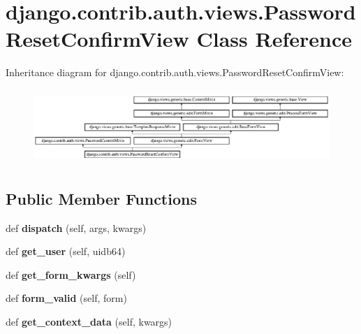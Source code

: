 \hypertarget{classdjango_1_1contrib_1_1auth_1_1views_1_1_password_reset_confirm_view}{}\section{django.\+contrib.\+auth.\+views.\+Password\+Reset\+Confirm\+View Class Reference}
\label{classdjango_1_1contrib_1_1auth_1_1views_1_1_password_reset_confirm_view}
Inheritance diagram for django.\+contrib.\+auth.\+views.\+Password\+Reset\+Confirm\+View\+:\begin{figure}[H]
\begin{center}
\leavevmode
\includegraphics[height=2.854230cm]{classdjango_1_1contrib_1_1auth_1_1views_1_1_password_reset_confirm_view}
\end{center}
\end{figure}
\subsection*{Public Member Functions}
\begin{DoxyCompactItemize}
\item 
\mbox{\label{classdjango_1_1contrib_1_1auth_1_1views_1_1_password_reset_confirm_view_a5b547ab9755b7d4ef79f688ece3e1d69}} 
def {\bfseries dispatch} (self, args, kwargs)
\item 
\mbox{\label{classdjango_1_1contrib_1_1auth_1_1views_1_1_password_reset_confirm_view_a6ed334a62932c696b4cb526a434778a7}} 
def {\bfseries get\+\_\+user} (self, uidb64)
\item 
\mbox{\label{classdjango_1_1contrib_1_1auth_1_1views_1_1_password_reset_confirm_view_a98c2c808d29b0e81720825d01c0d0de3}} 
def {\bfseries get\+\_\+form\+\_\+kwargs} (self)
\item 
\mbox{\label{classdjango_1_1contrib_1_1auth_1_1views_1_1_password_reset_confirm_view_a4f998ba90f4c979f0af771504f9f1379}} 
def {\bfseries form\+\_\+valid} (self, form)
\item 
\mbox{\label{classdjango_1_1contrib_1_1auth_1_1views_1_1_password_reset_confirm_view_aff88718e9c3b31bec87c9b0b8bda1553}} 
def {\bfseries get\+\_\+context\+\_\+data} (self, kwargs)
\end{DoxyCompactItemize}
